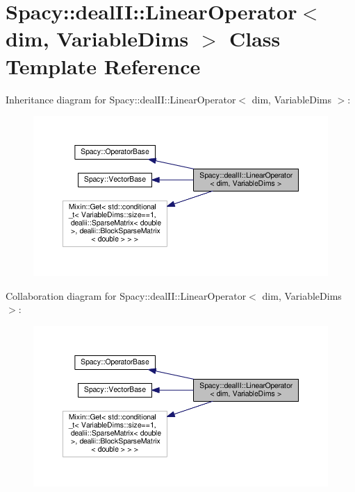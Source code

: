 \hypertarget{classSpacy_1_1dealII_1_1LinearOperator}{\section{Spacy\-:\-:deal\-I\-I\-:\-:Linear\-Operator$<$ dim, Variable\-Dims $>$ Class Template Reference}
\label{classSpacy_1_1dealII_1_1LinearOperator}
}


Inheritance diagram for Spacy\-:\-:deal\-I\-I\-:\-:Linear\-Operator$<$ dim, Variable\-Dims $>$\-:
\nopagebreak
\begin{figure}[H]
\begin{center}
\leavevmode
\includegraphics[width=350pt]{classSpacy_1_1dealII_1_1LinearOperator__inherit__graph}
\end{center}
\end{figure}


Collaboration diagram for Spacy\-:\-:deal\-I\-I\-:\-:Linear\-Operator$<$ dim, Variable\-Dims $>$\-:
\nopagebreak
\begin{figure}[H]
\begin{center}
\leavevmode
\includegraphics[width=350pt]{classSpacy_1_1dealII_1_1LinearOperator__coll__graph}
\end{center}
\end{figure}
